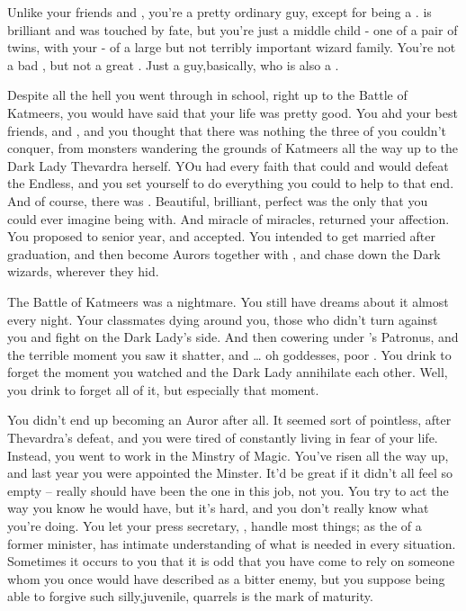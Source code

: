 \documentclass[char]{Katmeers}
\begin{document}
\name{\cRon{}}


Unlike your friends \cHermione{} and \cHarry{}, you're a pretty ordinary guy, except for being a \cRon{\magician}. \cHermione{} is brilliant and \cHarry{} was touched by fate, but you're just a middle child - one of a pair of twins, with your \cGinny{\sibling} \cGinny{} - of a large but not terribly important wizard family. You're not a bad \cRon{\magician}, but not a great \cRon{\magician}. Just a guy,basically, who is also a \cRon{\magician}.

Despite all the hell you went through in school, right up to the Battle of Katmeers, you would have said that your life was pretty good. You ahd your best friends, \cHermione{} and \cHarry{}, and you thought that there was nothing the three of you couldn't conquer, from monsters wandering the grounds of Katmeers all the way up to the Dark Lady Thevardra herself. YOu had every faith that \cHarry{} could and would defeat the Endless, and you set yourself to do everything you could to help \cHarry{\them} to that end. And of course, there was \cHermione{}. Beautiful, brilliant, perfect \cHermione{} was the only \cHermione{\kid} that you could ever imagine being with. And miracle of miracles, \cHermione{\they} returned your affection. You proposed to \cHermione{\them} senior year, and \cHermione{\they} accepted. You intended to get married after graduation, and then become Aurors together with \cHarry{}, and chase down the Dark wizards, wherever they hid.

The Battle of Katmeers was a nightmare. You still have dreams about it almost every night. Your classmates dying around you, those who didn't turn against you and fight on the Dark Lady's side. And then cowering under \cHermione{}'s Patronus, and the terrible moment you saw it shatter, and \cHarry{}\ldots{} oh goddesses, poor \cHarry{}. You drink to forget the moment you watched \cHarry{\they} and the Dark Lady annihilate each other. Well, you drink to forget all of it, but especially that moment.

You didn't end up becoming an Auror after all. It seemed sort of pointless, after Thevardra's defeat, and you were tired of constantly living in fear of your life. Instead, you went to work in the Minstry of Magic. You've risen all the way up, and last year you were appointed the Minster. It'd be great if it didn't all feel so empty -- \cHarry{} really should have been the one in this job, not you. You try to act the way you know he would have, but it's hard, and you don't really know what you're doing. You let your press secretary, \cLucius{}, handle most things; as the \cLucius{\offspring}  of a former minister, \cLucius{\they} has intimate understanding of what is needed in every situation. Sometimes it occurs to you that it is odd that you have come to rely on someone whom you once would have described as a bitter enemy, but you suppose being able to forgive such silly,juvenile, quarrels is the mark of maturity.
\end{document}
